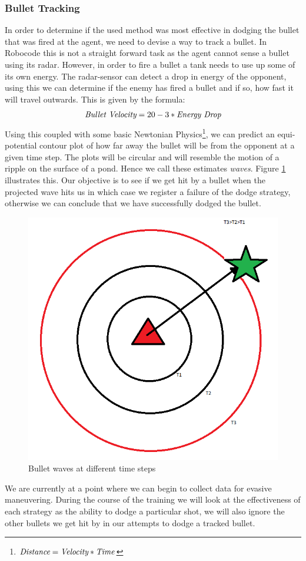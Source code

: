 \documentclass{article}
\theoremstyle{plain}
\theoremstyle{definition}
\theoremstyle{remark}
\begin{document}
\subsubsection*{Bullet Tracking}
In order to determine if the used method was most effective in dodging the bullet that was fired at the agent, we need to devise a way to track a bullet. In Robocode this is not a straight forward task as the agent cannot sense a bullet using its radar. However, in order to fire a bullet a tank needs to use up some of its own energy. The radar-sensor can detect a drop in energy of the opponent, using this we can determine if the enemy has fired a bullet and if so, how fast it will travel outwards. This is given by the formula:
$$\emph{Bullet Velocity} = 20 - 3 * \emph{Energy Drop}$$
Using this coupled with some basic Newtonian Physics\footnote{$\emph{Distance} = \emph{Velocity} * \emph{Time}$}, we can predict an equi-potential contour plot of how far away the bullet will be from the opponent at a given time step. The plots will be circular and will resemble the motion of a ripple on the surface of a pond. Hence we call these estimates \emph{waves}. Figure \ref{b_wave} illustrates this. Our objective is to see if we get hit by a bullet when the projected wave hits us in which case we register a failure of the dodge strategy, otherwise we can conclude that we have successfully dodged the bullet. \\

\begin{figure}[h]
	\centering
		\includegraphics[width=7 cm]{bullet_wave.png}
	\caption{Bullet waves at different time steps}
	\label{b_wave}
\end{figure}

We are currently at a point where we can begin to collect data for evasive maneuvering. During the course of the training we will look at the effectiveness of each strategy as the ability to dodge a particular shot, we will also ignore the other bullets we get hit by in our attempts to dodge a tracked bullet.
\end{document}
